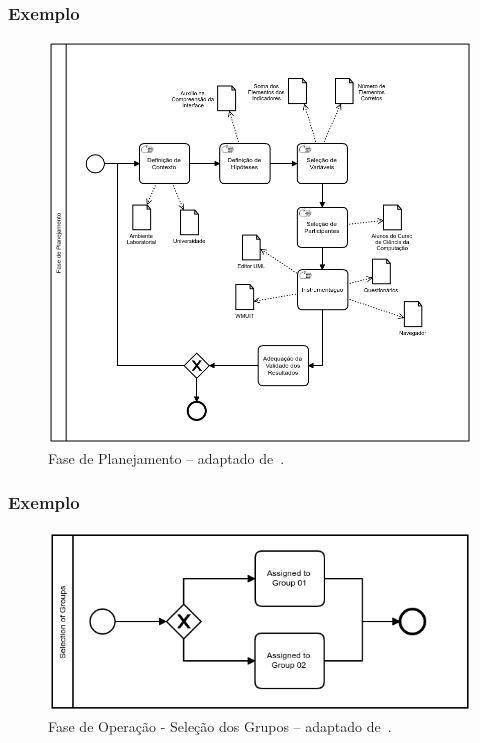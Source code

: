 \documentclass[aspectratio=169]{beamer}
\begin{document}
\begin{frame}
\frametitle{Exemplo}
\justifying

\begin{figure}
\centering
\includegraphics[scale=0.17]{images/modelo-planejamento.png}
\caption{Fase de Planejamento -- adaptado de~\cite{martins}.}
\label{image:fase-planejamento}
\end{figure}


\end{frame}

\begin{frame}
\frametitle{Exemplo}
\justifying

\begin{figure}
\centering
\includegraphics[scale=0.32]{images/selecao.png}
\caption{Fase de Operação - Seleção dos Grupos -- adaptado de~\cite{martins}.}
\label{image:selecao-grupos}
\end{figure}

\end{frame}
\end{document}
